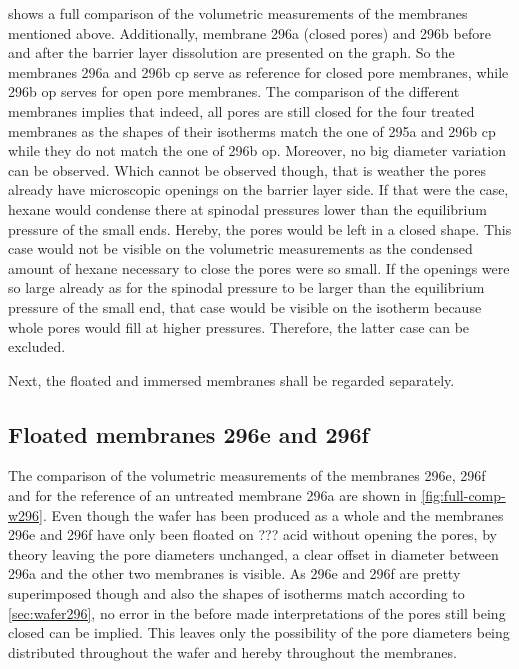 \documentclass[thesis.tex]{subfiles}
\begin{document}
       shows a full comparison of the volumetric measurements of the membranes mentioned above. Additionally, membrane 296a (closed pores) and 296b before and after the barrier layer dissolution are presented on the graph. So the membranes 296a and 296b cp serve as reference for closed pore membranes, while 296b op serves for open pore membranes. The comparison of the different membranes implies that indeed, all pores are still closed for the four treated membranes as the shapes of their isotherms match the one of 295a and 296b cp while they do not match the one of 296b op. Moreover, no big diameter variation can be observed. Which cannot be observed though, that is weather the pores already have microscopic openings on the barrier layer side. If that were the case, hexane would condense there at spinodal pressures lower than the equilibrium pressure of the small ends. Hereby, the pores would be left in a closed shape. This case would not be visible on the volumetric measurements as the condensed amount of hexane necessary to close the pores were so small. If the openings were so large already as for the spinodal pressure to be larger than the equilibrium pressure of the small end, that case would be visible on the isotherm because whole pores would fill at higher pressures. Therefore, the latter case can be excluded.

      Next, the floated and immersed membranes shall be regarded separately.

      


      \subsection{Floated membranes 296e and 296f}
      \label{subsec:floated-membranes}

          The comparison of the volumetric measurements of the membranes 296e, 296f and for the reference of an untreated membrane 296a are shown in \cref{fig:full-comp-w296}. Even though the wafer has been produced as a whole and the membranes 296e and 296f have only been floated on ??? acid without opening the pores, by theory leaving the pore diameters unchanged, a clear offset in diameter between 296a and the other two membranes is visible. As 296e and 296f are pretty superimposed though and also the shapes of isotherms match according to \cref{sec:wafer296}, no error in the before made interpretations of the pores still being closed can be implied. This leaves only the possibility of the pore diameters being distributed throughout the wafer and hereby throughout the membranes.
\end{document}
